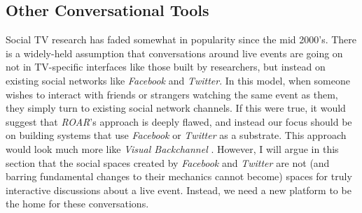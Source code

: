 % 	
% 	
% 
% 
% 
% 
% 
% 
% 
% 








\subsection{Other Conversational Tools}

Social TV research has faded somewhat in popularity since the mid 2000's.  There is a widely-held assumption that conversations around live events are going on not in TV-specific interfaces like those built by researchers, but instead on existing social networks like \emph{Facebook} and \emph{Twitter}. In this model, when someone wishes to interact with friends or strangers watching the same event as them, they simply turn to existing social network channels. If this were true, it would suggest that \emph{ROAR}'s approach is deeply flawed, and instead our focus should be on building systems that use \emph{Facebook} or \emph{Twitter} as a substrate. This approach would look much more like \emph{Visual Backchannel} \citep{Dork:2010fb}. However, I will argue in this section that the social spaces created by \emph{Facebook} and \emph{Twitter} are not (and barring fundamental changes to their mechanics cannot become) spaces for truly interactive discussions about a live event. Instead, we need a new platform to be the home for these conversations.

